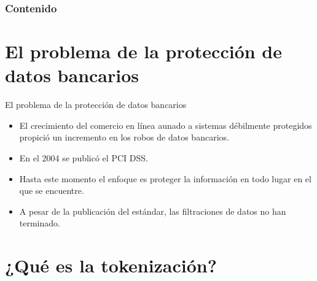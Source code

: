 \documentclass{beamer}
\begin{document}
  {
  \frame{\titlepage}}

  \begin{frame}
    \frametitle{Contenido}
    \setcounter{tocdepth}{1}
    \tableofcontents
  \end{frame}

  \setlength{\parskip}{0.5em}

  \section{El problema de la protección de datos bancarios}

  \begin{frame}{El problema de la protección de datos bancarios}
    \begin{itemize}
      \item El crecimiento del comercio en línea aunado a sistemas débilmente
        protegidos propició un incremento en los robos de datos bancarios.
      \item En el 2004 se publicó el PCI DSS\footnotemark.
      \item Hasta este momento el enfoque es proteger la información en todo
        lugar en el que se encuentre.
      \item A pesar de la publicación del estándar, las filtraciones de datos
        no han terminado.
    \end{itemize}
  \end{frame}

  \section{¿Qué es la tokenización?}
\end{document}
